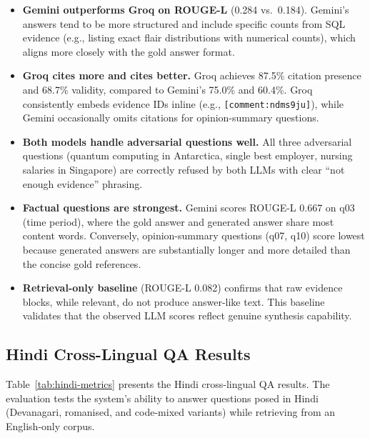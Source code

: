 \documentclass[11pt,a4paper]{article}
\begin{document}
\begin{itemize}[leftmargin=*]
  \item \textbf{Gemini outperforms Groq on ROUGE-L} (0.284 vs.\ 0.184). Gemini's answers tend to be more structured and include specific counts from SQL evidence (e.g., listing exact flair distributions with numerical counts), which aligns more closely with the gold answer format.
  
  \item \textbf{Groq cites more and cites better.} Groq achieves 87.5\% citation presence and 68.7\% validity, compared to Gemini's 75.0\% and 60.4\%. Groq consistently embeds evidence IDs inline (e.g., \texttt{[comment:ndms9ju]}), while Gemini occasionally omits citations for opinion-summary questions.
  
  \item \textbf{Both models handle adversarial questions well.} All three adversarial questions (quantum computing in Antarctica, single best employer, nursing salaries in Singapore) are correctly refused by both LLMs with clear ``not enough evidence'' phrasing.
  
  \item \textbf{Factual questions are strongest.} Gemini scores ROUGE-L 0.667 on q03 (time period), where the gold answer and generated answer share most content words. Conversely, opinion-summary questions (q07, q10) score lowest because generated answers are substantially longer and more detailed than the concise gold references.
  
  \item \textbf{Retrieval-only baseline} (ROUGE-L 0.082) confirms that raw evidence blocks, while relevant, do not produce answer-like text. This baseline validates that the observed LLM scores reflect genuine synthesis capability.
\end{itemize}

\subsection{Hindi Cross-Lingual QA Results}

Table~\ref{tab:hindi-metrics} presents the Hindi cross-lingual QA results. The evaluation tests the system's ability to answer questions posed in Hindi (Devanagari, romanised, and code-mixed variants) while retrieving from an English-only corpus.
\end{document}
